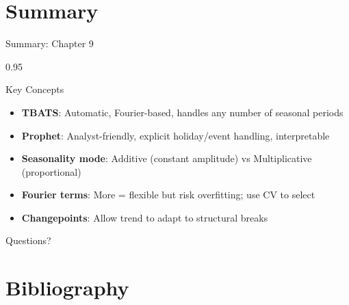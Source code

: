 \documentclass[9pt, aspectratio=169, t]{beamer}
\begin{document}
\section{Summary}

\begin{frame}{Summary: Chapter 9}
    \begin{cminipage}{0.95\textwidth}
    \begin{exampleblock}{Key Concepts}
        \begin{itemize}\setlength{\itemsep}{2pt}
            \item[\textcolor{MainBlue}{\textbf{1.}}] \textbf{TBATS}: Automatic, Fourier-based, handles any number of seasonal periods
            \item[\textcolor{MainBlue}{\textbf{2.}}] \textbf{Prophet}: Analyst-friendly, explicit holiday/event handling, interpretable
            \item[\textcolor{MainBlue}{\textbf{3.}}] \textbf{Seasonality mode}: Additive (constant amplitude) vs Multiplicative (proportional)
            \item[\textcolor{MainBlue}{\textbf{4.}}] \textbf{Fourier terms}: More = flexible but risk overfitting; use CV to select
            \item[\textcolor{MainBlue}{\textbf{5.}}] \textbf{Changepoints}: Allow trend to adapt to structural breaks
        \end{itemize}
    \end{exampleblock}

    \vspace{0.5cm}
    \begin{center}
        \Large\textcolor{MainBlue}{Questions?}
    \end{center}
    \end{cminipage}
\end{frame}


\section{Bibliography}
\end{document}

